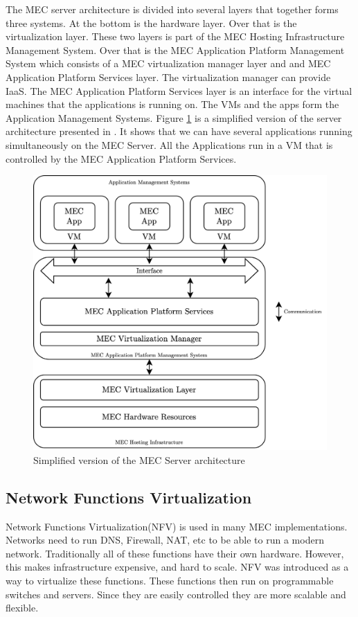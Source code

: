 The MEC server architecture is divided into several layers that together forms three systems\cite{patel_mec_nodate}. At the bottom is the hardware layer. Over that is the virtualization layer. These two layers is part of the MEC Hosting Infrastructure Management System. Over that is the MEC Application Platform Management System which consists of a MEC virtualization manager layer and and MEC Application Platform Services layer. The virtualization manager can provide IaaS. The MEC Application Platform Services layer is an interface for the virtual machines that the applications is running on. The VMs and the apps form the Application Management Systems. Figure \ref{fig:MEC_Server} is a simplified version of the server architecture presented in \cite{patel_mec_nodate}. It shows that we can have several applications running simultaneously on the MEC Server. All the Applications run in a VM that is controlled by the MEC Application Platform Services.
\begin{figure}[t]
    \centering
    \includegraphics[scale=0.8]{chapters/4_architectures/figures/MEC_Server.png}
    \caption{Simplified version of the MEC Server architecture}
    \label{fig:MEC_Server}
\end{figure}

\subsection{Network Functions Virtualization}
Network Functions Virtualization(NFV) is used in many MEC implementations\cite{patel_mec_nodate}. Networks need to run DNS, Firewall, NAT, etc to be able to run a modern network. Traditionally all of these functions have their own hardware. However, this makes infrastructure expensive, and hard to scale. NFV was introduced as a way to virtualize these functions. These functions then run on programmable switches and servers. Since they are easily controlled they are more scalable and flexible.

